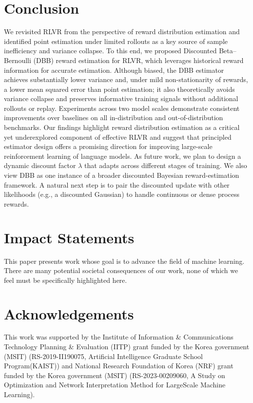 \section{Conclusion}

We revisited RLVR from the perspective of reward distribution estimation and identified point estimation under limited rollouts as a key source of sample inefficiency and variance collapse.
To this end, we proposed Discounted Beta--Bernoulli (DBB) reward estimation for RLVR, which leverages historical reward information for accurate estimation.
Although biased, the DBB estimator achieves substantially lower variance and, under mild non-stationarity of rewards, a lower mean squared error than point estimation; it also theoretically avoids variance collapse and preserves informative training signals without additional rollouts or replay.
Experiments across two model scales demonstrate consistent improvements over baselines on all in-distribution and out-of-distribution benchmarks.
Our findings highlight reward distribution estimation as a critical yet underexplored component of effective RLVR and suggest that principled estimator design offers a promising direction for improving large-scale reinforcement learning of language models.
As future work, we plan to design a dynamic discount factor $\lambda$ that adapts across different stages of training.
We also view DBB as one instance of a broader discounted Bayesian reward-estimation framework.
A natural next step is to pair the discounted update with other likelihoods (e.g., a discounted Gaussian) to handle continuous or dense process rewards.


\section*{Impact Statements}
This paper presents work whose goal is to advance the field of machine learning. There are many potential societal consequences of our work, none of which we feel must be specifically highlighted here.

\section*{Acknowledgements}
This work was supported by the Institute of Information \& Communications Technology Planning \& Evaluation (IITP) grant funded by the Korea government (MSIT) (RS-2019-II190075, Artificial Intelligence Graduate School Program(KAIST)) and National Research Foundation of Korea (NRF) grant funded by the Korea government (MSIT)
(RS-2023-00209060, A Study on Optimization and Network Interpretation Method for LargeScale Machine Learning).